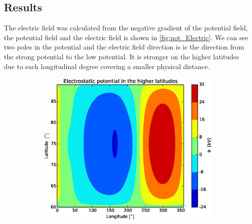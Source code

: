 \documentclass[x11names]{article}
\begin{document}
\subsection{Results}
  The electric field was calculated from the negative gradient of the potential field, the potential field and the electric field is shown in \cref{fig:pot_Electric}. We can see two poles in the potential and the electric field direction is is the direction from the strong potential to the low potential. It is stronger on the higher latitudes due to each longitudinal degree covering a smaller physical distance.

    \begin{figure}
      \centering
        \begin{subfigure}{0.75\textwidth}
        \includegraphics[width = \textwidth]{../source/potential}
      \end{subfigure}
      \hfill
      \begin{subfigure}{0.75\textwidth}

\end{subfigure}
\end{figure}
\end{document}
